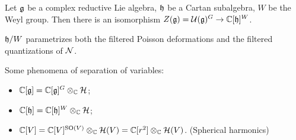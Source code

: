 \begin{thm}
  Let $\mathfrak{g}$ be a complex reductive Lie algebra, $\mathfrak{h}$ be a Cartan subalgebra, $W$ be the Weyl group. Then there is an isomorphism $Z(\mathfrak{g}) = \mathcal{U}(\mathfrak{g})^{G} \to \mathbb{C}[\mathfrak{h}]^W$.
\end{thm}

\begin{cor}
  $\mathfrak{h}/W$ parametrizes both the filtered Poisson deformations and the filtered quantizations of $\mathcal{N}$.
\end{cor}



Some phenomena of separation of variables:
\begin{itemize}
  \item $\mathbb{C}[\mathfrak{g}] = \mathbb{C}[\mathfrak{g}]^G \otimes_{\mathbb{C}} \mathcal{H}$;
  \item $\mathbb{C}[\mathfrak{h}] = \mathbb{C}[\mathfrak{h}]^W \otimes_{\mathbb{C}} \mathcal{H}$;
  \item $\mathbb{C}[V] = \mathbb{C}[V]^{\operatorname{SO}(V)} \otimes_{\mathbb{C}} \mathcal{H}(V) = \mathbb{C}[r^2] \otimes_{\mathbb{C}} \mathcal{H}(V)$. (Spherical harmonics)
\end{itemize}

